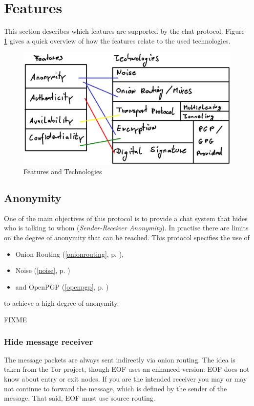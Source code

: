 \section{Features}
\label{protofeatures}
This section describes which features are supported by the chat protocol.
Figure \ref{features-technologies} gives a quick overview of how the
features relate to the used technologies.
\begin{figure}
    \centering
    \caption{Features and Technologies}
    \label{features-technologies}
    \includegraphics[scale=0.8]{features-technologies.eps}
\end{figure}
\subsection{Anonymity}
\label{featanonymity}
One of the main objectives of this protocol is to provide a chat system that
hides who is talking to whom (\textit{Sender-Receiver Anonymity}). 
In practise there are limits on the degree of anonymity that can be reached.
This protocol specifies the use of
\begin{itemize}
\item Onion Routing (\ref{onionrouting}, p. \pageref{onionrouting}),
\item Noise (\ref{noise}, p. \pageref{noise})
\item and OpenPGP (\ref{openpgp}, p. \pageref{openpgp})
\end{itemize}
to achieve a high degree of anonymity.

FIXME

\subsubsection{Hide message receiver}
The message packets are always sent indirectly via onion routing\cite{onion-1}.
The idea is taken from the Tor project\cite{tor-1}, though EOF uses an enhanced
version: EOF does not know about entry or exit nodes. If you are the intended
receiver you may or may not continue to forward the message, which is defined
by the sender of the message. That said, EOF must use source 
routing\cite{source-routing-1}.

